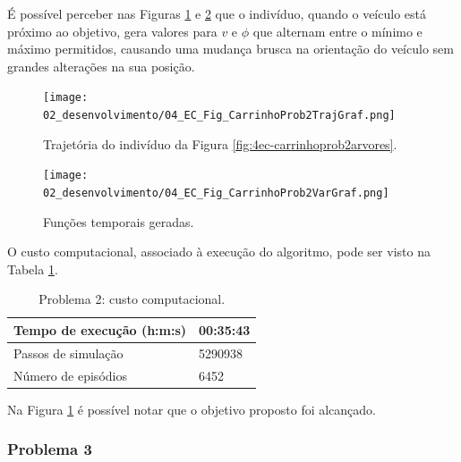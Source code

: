 
É possível perceber nas Figuras \ref{fig:4ec-carrinhoprob2trajgraf} e \ref{fig:4ec-carrinhoprob2vargraf} que o indivíduo, quando o veículo está próximo ao objetivo, gera valores para $v$ e $\phi$ que alternam entre o mínimo e máximo permitidos, causando uma mudança brusca na orientação do veículo sem grandes alterações na sua posição.

\begin{figure}[H]
	\centering
	\texttt{[image: 02\_desenvolvimento/04\_EC\_Fig\_CarrinhoProb2TrajGraf.png]}
	\caption{Trajetória do indivíduo da Figura \ref{fig:4ec-carrinhoprob2arvores}.}
	\label{fig:4ec-carrinhoprob2trajgraf}
\end{figure}

\begin{figure}[H]
	\centering
	\texttt{[image: 02\_desenvolvimento/04\_EC\_Fig\_CarrinhoProb2VarGraf.png]}
	\caption{Funções temporais geradas.}
	\label{fig:4ec-carrinhoprob2vargraf}
\end{figure}

O custo computacional, associado à execução do algoritmo, pode ser visto na Tabela \ref{tab:4ec-carrinhoprob2custocomp}.

\begin{table}[H]
	\centering
	\begin{tabular}{l|l} \toprule
		{{Tempo de execução (h:m:s)}} & {00:35:43} \\\midrule
		{{Passos de simulação}} & {5290938} \\\midrule
		{{Número de episódios}} & {6452} \\
		\bottomrule
	\end{tabular}
	\caption{Problema 2: custo computacional.}\label{tab:4ec-carrinhoprob2custocomp}
\end{table}

Na Figura \ref{fig:4ec-carrinhoprob2trajgraf} é possível notar que o objetivo proposto foi alcançado.

\subsubsection{Problema 3}\label{sssec:4ec-carrinhoprob3}

